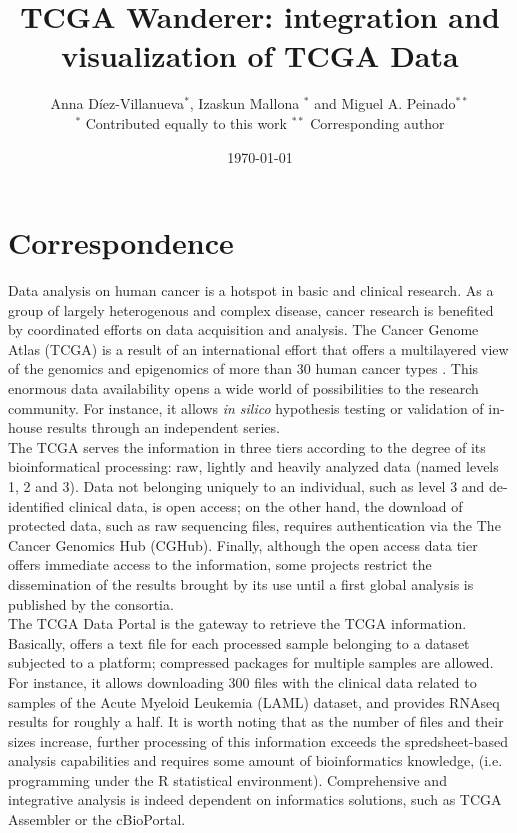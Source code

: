\documentclass{article}
\title{TCGA Wanderer: integration and visualization of TCGA Data}
\author{Anna D{\'i}ez-Villanueva$^*$, Izaskun Mallona $^*$ and Miguel A. Peinado$^{**}$ \\
\vspace{3cm}
 $^*$ Contributed equally to this work
 $^{**}$ Corresponding author
}
\date{\today}
\begin{document}
\maketitle

\section{Correspondence}

Data analysis on human cancer is a hotspot in basic and clinical research. As a group of largely heterogenous and complex disease, cancer research is benefited by coordinated efforts on data acquisition and analysis. The Cancer Genome Atlas (TCGA) is a result of an international effort that offers a multilayered view of the genomics and epigenomics of more than 30 human cancer types \cite{weinstein2013cancer}. This enormous data availability opens a wide world of possibilities to the research community. For instance, it allows \textit{in silico} hypothesis testing or validation of in-house results through an independent series.\\

The TCGA serves the information in three tiers according to the degree of its bioinformatical processing: raw, lightly and heavily analyzed data (named levels 1, 2 and 3). Data not belonging uniquely to an individual, such as level 3 and de-identified clinical data, is open access; on the other hand, the download of protected data, such as raw sequencing files, requires authentication via the The Cancer Genomics Hub (CGHub)\cite{wilks2014cancer}. Finally, although the open access data tier offers immediate access to the information, some projects restrict the dissemination of the results brought by its use until a first global analysis is published by the consortia.\\

The TCGA Data Portal is the gateway to retrieve the TCGA information. Basically, offers a text file for each processed sample belonging to a dataset subjected to a platform; compressed packages for multiple samples are allowed. For instance, it allows downloading 300 files with the clinical data related to samples of the Acute Myeloid Leukemia (LAML) dataset, and provides RNAseq results for roughly a half. It is worth noting that as the number of files and their sizes increase, further processing of this information exceeds the spredsheet-based analysis capabilities and requires some amount of bioinformatics knowledge, (i.e. programming under the R statistical environment). Comprehensive and integrative analysis is indeed dependent on informatics solutions, such as TCGA Assembler \cite{zhu2014tcga} or the cBioPortal\cite{gao2013integrative}.\\
\end{document}
